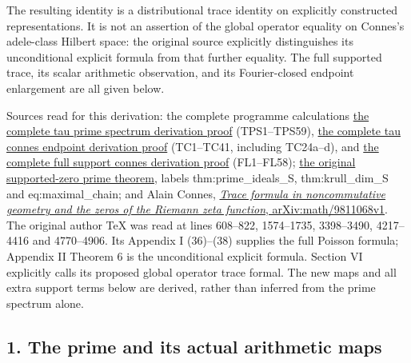 \documentclass[
  10pt,
  a4paper,
]{article}
\begin{document}
The resulting identity is a distributional trace identity on explicitly
constructed representations. It is not an assertion of the global
operator equality on Connes's adele-class Hilbert space: the original
source explicitly distinguishes its unconditional explicit formula from
that further equality. The full supported trace, its scalar arithmetic
observation, and its Fourier-closed endpoint enlargement are all given
below.

Sources read for this derivation: the complete programme calculations
\href{https://github.com/KokunoYumeto/zeta-function-research-reader/blob/adfbfe74fa49e31cb7aa068cf755fb083be37c32/workbenches/splitzero-tandem/branches/tau-zero-prime-positivity/supporting_proofs/TAU_PRIME_SPECTRUM_DERIVATION.md}{the
complete tau prime spectrum derivation proof} (TPS1--TPS59),
\href{https://github.com/KokunoYumeto/zeta-function-research-reader/blob/adfbfe74fa49e31cb7aa068cf755fb083be37c32/workbenches/splitzero-tandem/branches/tau-zero-prime-positivity/supporting_proofs/TAU_CONNES_ENDPOINT_DERIVATION.md}{the
complete tau connes endpoint derivation proof} (TC1--TC41, including
TC24a--d), and
\href{https://github.com/KokunoYumeto/zeta-function-research-reader/blob/adfbfe74fa49e31cb7aa068cf755fb083be37c32/workbenches/splitzero-tandem/branches/tau-zero-prime-positivity/supporting_proofs/FULL_SUPPORT_CONNES_DERIVATION.md}{the
complete full support connes derivation proof} (FL1--FL58);
\href{https://github.com/KokunoYumeto/zeta-function-research-reader/blob/ac168d55cbb400a6c8926a00d67909ba65646ac5/workbenches/splitzero-tandem/branches/identity-absorber-square/sources/17555345_11.tex}{the
original supported-zero prime theorem}, labels thm:prime\_ideals\_S,
thm:krull\_dim\_S and eq:maximal\_chain; and Alain Connes,
\href{https://arxiv.org/abs/math/9811068}{\emph{Trace formula in
noncommutative geometry and the zeros of the Riemann zeta function},
arXiv:math/9811068v1}. The original author TeX was read at lines
608--822, 1574--1735, 3398--3490, 4217--4416 and 4770--4906. Its
Appendix I (36)--(38) supplies the full Poisson formula; Appendix II
Theorem 6 is the unconditional explicit formula. Section VI explicitly
calls its proposed global operator trace formal. The new maps and all
extra support terms below are derived, rather than inferred from the
prime spectrum alone.

\subsection{1. The prime and its actual arithmetic
maps}\label{the-prime-and-its-actual-arithmetic-maps}
\end{document}
